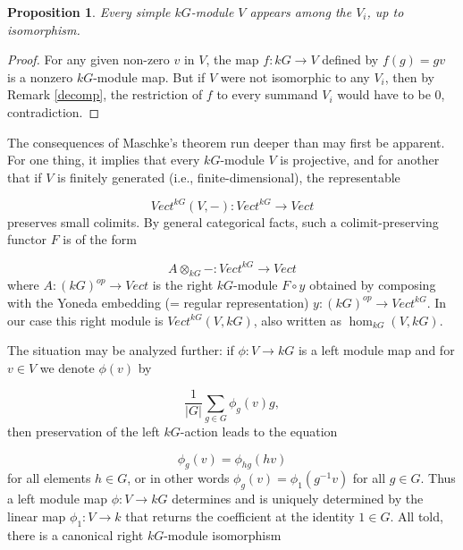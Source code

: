 \documentclass[12pt,titlepage]{article}
\theoremstyle{plain}
\newtheorem{prop}{Proposition}
\theoremstyle{definition}
\theoremstyle{remark}
\begin{document}
\begin{prop}
\label{all}\hypertarget{all}{}
Every simple $k G$-module $V$ appears among the $V_i$, up to isomorphism.

\end{prop}
\begin{proof}
For any given non-zero $v$ in $V$, the map $f: k G \to V$ defined by $f(g) = g v$ is a nonzero $k G$-module map. But if $V$ were not isomorphic to any $V_i$, then by Remark \ref{decomp}, the restriction of $f$ to every summand $V_i$ would have to be $0$, contradiction.

\end{proof}
The consequences of Maschke's theorem run deeper than may first be apparent. For one thing, it implies that every $k G$-module $V$ is projective, and for another that if $V$ is finitely generated (i.e., finite-dimensional), the representable

\begin{displaymath}
Vect^{k G}(V, -): Vect^{k G} \to Vect
\end{displaymath}
preserves small colimits. By general categorical facts, such a colimit-preserving functor $F$ is of the form

\begin{displaymath}
A \otimes_{k G} -: Vect^{k G} \to Vect
\end{displaymath}
where $A: (k G)^{op} \to Vect$ is the right $k G$-module $F \circ y$ obtained by composing with the Yoneda embedding (= regular representation) $y: (k G)^{op} \to Vect^{k G}$. In our case this right module is $Vect^{k G}(V, k G)$, also written as $\hom_{k G}(V, k G)$.

The situation may be analyzed further: if $\phi: V \to k G$ is a left module map and for $v \in V$ we denote $\phi(v)$ by

\begin{displaymath}
\frac1{{|G|}} \sum_{g \in G} \phi_g(v) g,
\end{displaymath}
then preservation of the left $k G$-action leads to the equation

\begin{displaymath}
\phi_g(v) = \phi_{h g}(h v)
\end{displaymath}
for all elements $h \in G$, or in other words $\phi_g(v) = \phi_1(g^{-1} v)$ for all $g \in G$. Thus a left module map $\phi: V \to k G$ determines and is uniquely determined by the linear map $\phi_1: V \to k$ that returns the coefficient at the identity $1 \in G$. All told, there is a canonical right $k G$-module isomorphism
\end{document}

